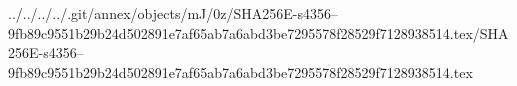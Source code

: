 ../../../../.git/annex/objects/mJ/0z/SHA256E-s4356--9fb89c9551b29b24d502891e7af65ab7a6abd3be7295578f28529f7128938514.tex/SHA256E-s4356--9fb89c9551b29b24d502891e7af65ab7a6abd3be7295578f28529f7128938514.tex